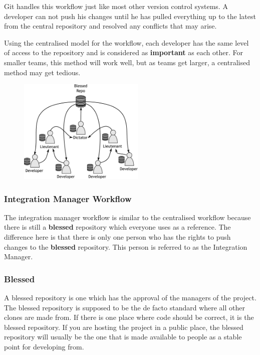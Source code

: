 Git handles this workflow just like most other version control systems.  A developer can not push his changes until he has pulled everything up to the latest from the central repository and resolved any conflicts that may arise.

Using the centralised model for the workflow, each developer has the same level of access to the repository and is considered as \textbf{important} as each other.  For smaller teams, this method will work well, but as teams get larger, a centralised method may get tedious.

\begin{figure}[htbp]
\includegraphics[width=6cm]{d1.pdf}
\end{figure}

\subsubsection{Integration Manager Workflow}
The integration manager workflow is similar to the centralised workflow because there is still a \textbf{blessed} repository which everyone uses as a reference.  The difference here is that there is only one person who has the rights to push changes to the \textbf{blessed} repository.  This person is referred to as the Integration Manager.  

\begin{framed}[htbp]
\subsubsection{Blessed}

A blessed repository is one which has the approval of the managers of the project.  The blessed repository is supposed to be the de facto standard where all other clones are made from.  If there is one place where code should be correct, it is the blessed repository.  If you are hosting the project in a public place, the blessed repository will usually be the one that is made available to people as a stable point for developing from.
\end{framed}

